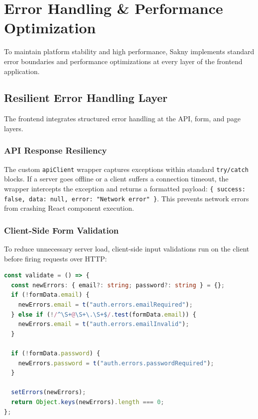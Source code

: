 \documentclass[12pt,a4paper]{article}
\begin{document}
\section{Error Handling \& Performance Optimization}

To maintain platform stability and high performance, Sakny implements standard error boundaries and performance optimizations at every layer of the frontend application.

\subsection{Resilient Error Handling Layer}

The frontend integrates structured error handling at the API, form, and page layers.

\subsubsection{API Response Resiliency}

The custom \texttt{apiClient} wrapper captures exceptions within standard \texttt{try/catch} blocks. If a server goes offline or a client suffers a connection timeout, the wrapper intercepts the exception and returns a formatted payload: \texttt{\{ success: false, data: null, error: "Network error" \}}. This prevents network errors from crashing React component execution.

\subsubsection{Client-Side Form Validation}

To reduce unnecessary server load, client-side input validations run on the client before firing requests over HTTP:

\begin{lstlisting}[language=TypeScript,title={LoginForm validation logic}]
const validate = () => {
  const newErrors: { email?: string; password?: string } = {};
  if (!formData.email) {
    newErrors.email = t("auth.errors.emailRequired");
  } else if (!/^\S+@\S+\.\S+$/.test(formData.email)) {
    newErrors.email = t("auth.errors.emailInvalid");
  }
  
  if (!formData.password) {
    newErrors.password = t("auth.errors.passwordRequired");
  }

  setErrors(newErrors);
  return Object.keys(newErrors).length === 0;
};
\end{lstlisting}
\end{document}
